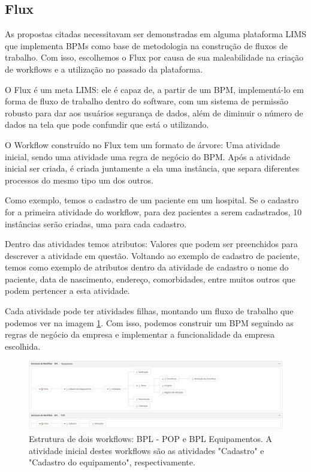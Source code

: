 \subsection{Flux}

As propostas citadas necessitavam ser demonstradas em alguma plataforma LIMS que implementa BPMs como base de metodologia na construção de fluxos de trabalho. Com isso, escolhemos o Flux por causa de sua maleabilidade na criação de workflows e a utilização no passado da plataforma.

O Flux é um meta LIMS: ele é capaz de, a partir de um BPM, implementá-lo em forma de fluxo de trabalho dentro do software, com um sistema de permissão robusto para dar aos usuários segurança de dados, além de diminuir o número de dados na tela que pode confundir que está o utilizando.

O Workflow construído no Flux tem um formato de árvore: Uma atividade inicial, sendo uma atividade uma regra de negócio do BPM. Após a atividade inicial ser criada, é criada juntamente a ela uma instância, que separa diferentes processos do mesmo tipo um dos outros.

Como exemplo, temos o cadastro de um paciente em um hospital. Se o cadastro for a primeira atividade do workflow, para dez pacientes a serem cadastrados, 10 instâncias serão criadas, uma para cada cadastro.

Dentro das atividades temos atributos: Valores que podem ser preenchidos para descrever a atividade em questão. Voltando ao exemplo de cadastro de paciente, temos como exemplo de atributos dentro da atividade de cadastro o nome do paciente, data de nascimento, endereço, comorbidades, entre muitos outros que podem pertencer a esta atividade.

Cada atividade pode ter atividades filhas, montando um fluxo de trabalho que podemos ver na imagem \ref{fig:estrutura_workflow}. Com isso, podemos construir um BPM seguindo as regras de negócio da empresa e implementar a funcionalidade da empresa escolhida.

\begin{figure}
    \centering
    \includegraphics[width=1\textwidth]{imgs/BPL/estrutura.png}
    \caption{Estrutura de dois workflows: BPL - POP e BPL Equipamentos. A atividade inicial destes workflows são as atividades "Cadastro" e "Cadastro do equipamento", respectivamente.}
    \label{fig:estrutura_workflow}
\end{figure}

